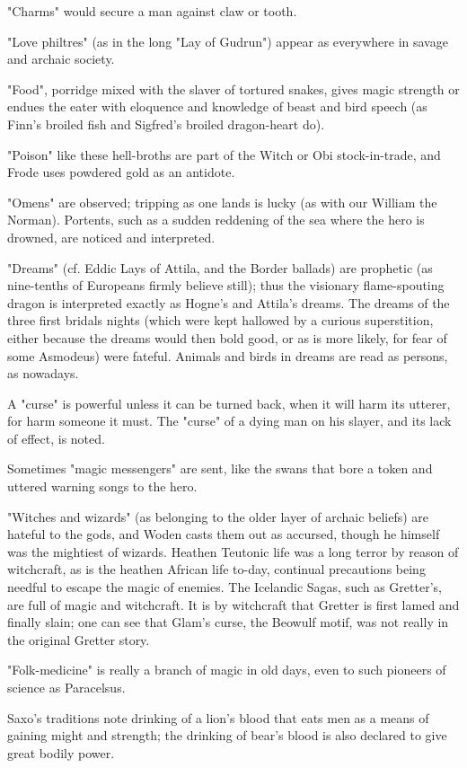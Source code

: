 \documentclass[10pt,a4paper]{report}
\begin{document}
"Charms" would secure a man against claw or tooth.

"Love philtres" (as in the long "Lay of Gudrun") appear as everywhere in savage and archaic society.

"Food", porridge mixed with the slaver of tortured snakes, gives magic strength or endues the eater with eloquence and knowledge of beast and bird speech (as Finn's broiled fish and Sigfred's broiled dragon-heart do).

"Poison" like these hell-broths are part of the Witch or Obi stock-in-trade, and Frode uses powdered gold as an antidote.

"Omens" are observed; tripping as one lands is lucky (as with our William the Norman). Portents, such as a sudden reddening of the sea where the hero is drowned, are noticed and interpreted.

"Dreams" (cf. Eddic Lays of Attila, and the Border ballads) are prophetic (as nine-tenths of Europeans firmly believe still); thus the visionary flame-spouting dragon is interpreted exactly as Hogne's and Attila's dreams. The dreams of the three first bridals nights (which were kept hallowed by a curious superstition, either because the dreams would then bold good, or as is more likely, for fear of some Asmodeus) were fateful. Animals and birds in dreams are read as persons, as nowadays.

A "curse" is powerful unless it can be turned back, when it will harm its utterer, for harm someone it must. The "curse" of a dying man on his slayer, and its lack of effect, is noted.

Sometimes "magic messengers" are sent, like the swans that bore a token and uttered warning songs to the hero.

"Witches and wizards" (as belonging to the older layer of archaic beliefs) are hateful to the gods, and Woden casts them out as accursed, though he himself was the mightiest of wizards. Heathen Teutonic life was a long terror by reason of witchcraft, as is the heathen African life to-day, continual precautions being needful to escape the magic of enemies. The Icelandic Sagas, such as Gretter's, are full of magic and witchcraft. It is by witchcraft that Gretter is first lamed and finally slain; one can see that Glam's curse, the Beowulf motif, was not really in the original Gretter story.

"Folk-medicine" is really a branch of magic in old days, even to such pioneers of science as Paracelsus.

Saxo's traditions note drinking of a lion's blood that eats men as a means of gaining might and strength; the drinking of bear's blood is also declared to give great bodily power.
\end{document}
